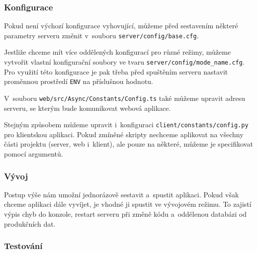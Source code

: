 \documentclass[a4paper,12pt]{article}
\def\code#1{\texttt{#1}}
\begin{document}
{{{{{{{{{{{\subsubsection{Konfigurace}

Pokud není výchozí konfigurace vyhovující, můžeme před sestavením některé parametry serveru změnit v~souboru \code{server/config/base.cfg}.



\vspace{-10pt}

Jestliže chceme mít více oddělených konfigurací pro různé režimy, můžeme vytvořit vlastní konfigurační soubory ve tvaru \code{server/config/mode\_name.cfg}. Pro využití této konfigurace je pak třeba před spuštěním serveru nastavit proměnnou prostředí \code{ENV} na příslušnou hodnotu.



V~souboru \code{web/src/Async/Constants/Config.ts} také můžeme upravit adresu serveru, se kterým bude komunikovat webová aplikace.



Stejným způsobem můžeme upravit i~konfiguraci \code{client/constants/config.py} pro klientskou aplikaci. Pokud zmíněné skripty nechceme aplikovat na všechny části projektu (server, web i~klient), ale pouze na některé, můžeme je specifikovat pomocí argumentů.



\vspace{-10pt}

\subsubsection{Vývoj}

Postup výše nám umožní jednorázově sestavit a~spustit aplikaci. Pokud však chceme aplikaci dále vyvíjet, je vhodné ji spustit ve vývojovém režimu. To zajistí výpis chyb do konzole, restart serveru při změně kódu a~oddělenou databázi od produkčních dat.



\subsubsection{Testování}

}}}}}}}}}}}
\end{document}
